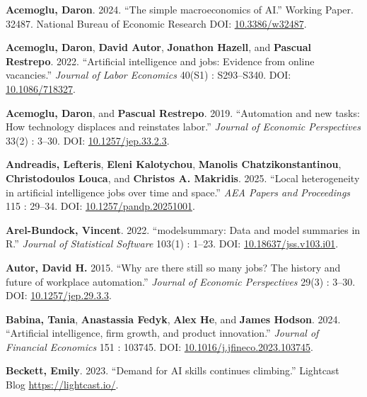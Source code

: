 \documentclass[
]{article}
\newlength{\cslhangindent}
\newenvironment{CSLReferences}[2] %
 {\begin{list}{}{%
  \setlength{\itemindent}{0pt}
  \setlength{\leftmargin}{0pt}
  \setlength{\parsep}{0pt}
  \ifodd #1
   \setlength{\leftmargin}{\cslhangindent}
   \setlength{\itemindent}{-1\cslhangindent}
  \fi
  \setlength{\itemsep}{#2\baselineskip}}}
 {\end{list}}
\begin{document}
\label{refs}
\begin{CSLReferences}{1}{0}
\textbf{Acemoglu, Daron}. 2024. {``The simple macroeconomics of {AI}.''}
Working Paper. 32487. National Bureau of Economic Research DOI:
\href{https://doi.org/10.3386/w32487}{10.3386/w32487}.

\textbf{Acemoglu, Daron}, \textbf{David Autor}, \textbf{Jonathon
Hazell}, and \textbf{Pascual Restrepo}. 2022. {``Artificial intelligence
and jobs: Evidence from online vacancies.''} \emph{Journal of Labor
Economics} 40(S1) : S293--S340. DOI:
\href{https://doi.org/10.1086/718327}{10.1086/718327}.

\textbf{Acemoglu, Daron}, and \textbf{Pascual Restrepo}. 2019.
{``Automation and new tasks: How technology displaces and reinstates
labor.''} \emph{Journal of Economic Perspectives} 33(2) : 3--30. DOI:
\href{https://doi.org/10.1257/jep.33.2.3}{10.1257/jep.33.2.3}.

\textbf{Andreadis, Lefteris}, \textbf{Eleni Kalotychou}, \textbf{Manolis
Chatzikonstantinou}, \textbf{Christodoulos Louca}, and \textbf{Christos
A. Makridis}. 2025. {``Local heterogeneity in artificial intelligence
jobs over time and space.''} \emph{AEA Papers and Proceedings} 115 :
29--34. DOI:
\href{https://doi.org/10.1257/pandp.20251001}{10.1257/pandp.20251001}.

\textbf{Arel-Bundock, Vincent}. 2022. {``{modelsummary}: Data and model
summaries in {R}.''} \emph{Journal of Statistical Software} 103(1) :
1--23. DOI:
\href{https://doi.org/10.18637/jss.v103.i01}{10.18637/jss.v103.i01}.

\textbf{Autor, David H.} 2015. {``Why are there still so many jobs? The
history and future of workplace automation.''} \emph{Journal of Economic
Perspectives} 29(3) : 3--30. DOI:
\href{https://doi.org/10.1257/jep.29.3.3}{10.1257/jep.29.3.3}.

\textbf{Babina, Tania}, \textbf{Anastassia Fedyk}, \textbf{Alex He}, and
\textbf{James Hodson}. 2024. {``Artificial intelligence, firm growth,
and product innovation.''} \emph{Journal of Financial Economics} 151 :
103745. DOI:
\href{https://doi.org/10.1016/j.jfineco.2023.103745}{10.1016/j.jfineco.2023.103745}.

\textbf{Beckett, Emily}. 2023. {``Demand for {AI} skills continues
climbing.''} Lightcast Blog \url{https://lightcast.io/}.


\end{CSLReferences}
\end{document}
